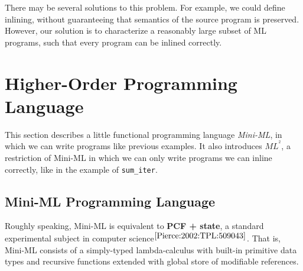 \documentclass[a4paper,11pt,oneside]{article}
\theoremstyle{plain}
\newcommand{\inlsrc}{\textit{ML}^{^2}}
\begin{document}
There may be several solutions to this problem. For example, we could define inlining, without guaranteeing that semantics of the source program is preserved. 
However, our solution is to characterize a reasonably large subset of ML programs, such that every program can be inlined correctly. 

\newpage
\section{Higher-Order Programming Language }
\label{sec:Mini-ML}

	This section describes a little functional programming language \textit{Mini-ML}, in which we can write programs like previous examples. 
	It also introduces ${\inlsrc}$, a restriction of Mini-ML in which we can only write programs we can inline correctly, like in the example of \texttt{sum\_iter}. 
	
\subsection{Mini-ML Programming Language}

	Roughly speaking, Mini-ML is equivalent to \textbf{PCF + state}, a standard experimental subject in computer science{\footnotesize$^{ \cite[p.~143]{Pierce:2002:TPL:509043}}$}. 
	That is, Mini-ML consists of a simply-typed lambda-calculus with built-in primitive data types and recursive functions extended with global store of modifiable references.
	
\end{document}
